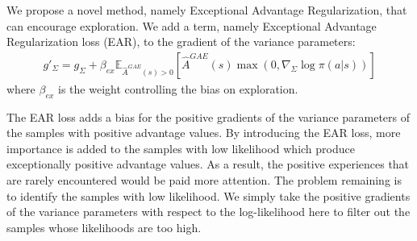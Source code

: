 We propose a novel method, namely  Exceptional Advantage Regularization, that can encourage exploration. We add a term, namely Exceptional Advantage Regularization loss (EAR), to the gradient of the variance parameters:
\begin{align}
g'_\Sigma = g_\Sigma + \beta_{ex} \mathbb{E}_{\hat{A}^{GAE}(s) > 0} \left[
\hat{A}^{GAE}(s) 
\max\left(0,\nabla_\Sigma \log \pi (a|s)\right)\right]
\end{align}
where $\beta_{ex} $ is the weight controlling the bias on exploration.

The EAR loss adds a bias for the positive gradients of the variance parameters of the samples with positive advantage values. By introducing the EAR loss, more importance is added to the samples with low likelihood which produce exceptionally positive advantage values. As a result, the positive experiences that are rarely encountered would be paid more attention. The problem remaining is to identify the samples with low likelihood. We simply take the positive gradients of the variance parameters with respect to the log-likelihood here to filter out the samples whose likelihoods are too high.
